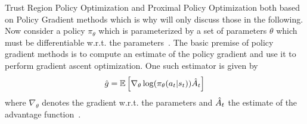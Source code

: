 Trust Region Policy Optimization and Proximal Policy Optimization both based on Policy Gradient methods which is why
will only discuss those in the following.
Now consider a policy $\pi_\theta$ which is parameterized by a set of parameters $\theta$ which must be differentiable w.r.t. the parameters~\cite{Sutton1999}.
The basic premise of policy gradient methods is to compute an estimate of the policy gradient and use it to perform gradient ascent
optimization.
One such estimator is given by
\begin{equation}
    \Hat{g} = \mathbb{E}\left[ \nabla_\theta \log(\pi_\theta(a_t | s_t)) \Hat{A}_t\right]
\end{equation}
where $\nabla_\theta$ denotes the gradient w.r.t. the parameters and $\Hat{A}_t$ the estimate of the advantage function~\cite{schulman2017ppo}.

